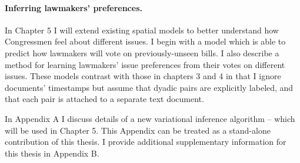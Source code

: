 
\paragraph{Inferring lawmakers' preferences.}

In Chapter 5 I will extend existing spatial models to better
understand how Congressmen feel about different issues.  I begin with
a model which is able to predict how lawmakers will vote on
previously-unseen bills. I also describe a method for learning
lawmakers' issue preferences from their votes on different issues.
These models contrast with those in chapters 3 and 4 in that I ignore
documents' timestamps but assume that dyadic pairs are explicitly
labeled, and that each pair is attached to a separate text document.

In Appendix A I discuss details of a new variational inference algorithm -- which
will be used in Chapter 5.  This Appendix can be treated as a
stand-alone contribution of this thesis.  I provide additional
supplementary information for this thesis in Appendix B.
